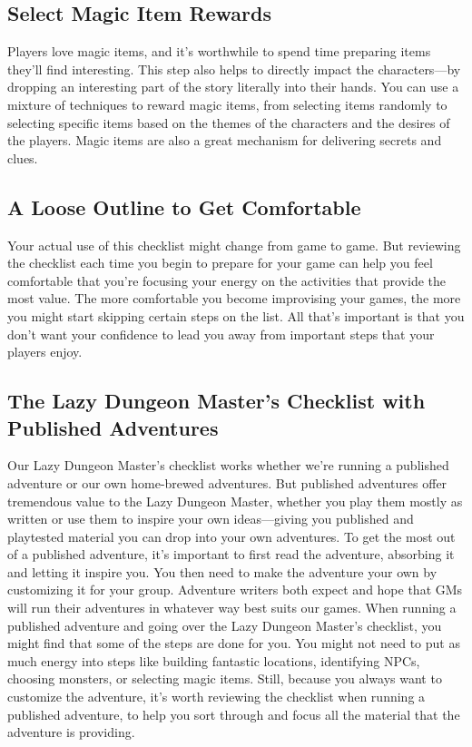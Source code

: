 \documentclass[10pt,a4paper,twoside,bg=print,twocolumn,openany,nodeprecatedcode]{dndbook}
\begin{document}
\subsection{Select Magic Item Rewards}
Players love magic items, and it's worthwhile to spend time preparing items they'll find interesting. This step also helps to directly impact the characters—by dropping an interesting part of the story literally into their hands. You can use a mixture of techniques to reward magic items, from selecting items randomly to selecting specific items based on the themes of the characters and the desires of the players. Magic items are also a great mechanism for delivering secrets and clues.
\subsection{A Loose Outline to Get Comfortable}
Your actual use of this checklist might change from game to game. But reviewing the checklist each time you begin to prepare for your game can help you feel comfortable that you're focusing your energy on the activities that provide the most value. The more comfortable you become improvising your games, the more you might start skipping certain steps on the list. All that's important is that you don't want your confidence to lead you away from important steps that your players enjoy.
\subsection{The Lazy Dungeon Master's Checklist with Published Adventures}
Our Lazy Dungeon Master's checklist works whether we're running a published adventure or our own home-brewed adventures. But published adventures offer tremendous value to the Lazy Dungeon Master, whether you play them mostly as written or use them to inspire your own ideas—giving you published and playtested material you can drop into your own adventures.
To get the most out of a published adventure, it's important to first read the adventure, absorbing it and letting it inspire you. You then need to make the adventure your own by customizing it for your group. Adventure writers both expect and hope that GMs will run their adventures in whatever way best suits our games.
When running a published adventure and going over the Lazy Dungeon Master's checklist, you might find that some of the steps are done for you. You might not need to put as much energy into steps like building fantastic locations, identifying NPCs, choosing monsters, or selecting magic items. Still, because you always want to customize the adventure, it's worth reviewing the checklist when running a published adventure, to help you sort through and focus all the material that the adventure is providing.
\end{document}
